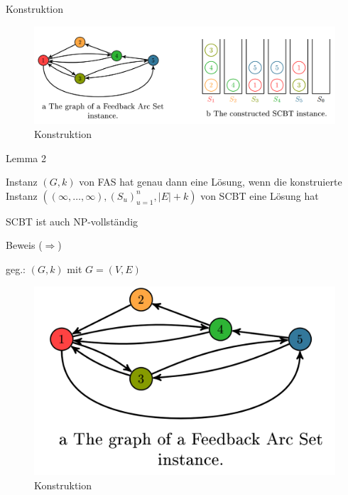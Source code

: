 \documentclass{beamer}
\begin{document}
\begin{frame}{Konstruktion}
\begin{figure}[ht]
		\includegraphics[width=\textwidth]{construct}
		\caption{Konstruktion}
    \end{figure}
\end{frame}

\begin{frame}{Lemma 2}
\begin{pointlist}
\item Instanz $(G,k)$ von FAS hat genau dann eine Lösung, wenn die konstruierte Instanz $((\infty, \dots, \infty), (S_u)_{u=1}^n, |E|+k)$ von SCBT eine Lösung hat
\begin{arrowlist}
\item SCBT ist auch NP-vollständig
\end{arrowlist}
\end{pointlist}
\end{frame}

\begin{frame}{Beweis (\glqq $\Rightarrow$\grqq)}
\begin{pointlist}
\item geg.: $(G,k)$ mit $G=(V,E)$
\end{pointlist}

	\begin{figure}[ht]
		\includegraphics[width=.75\textwidth]{graph}
		\caption{Konstruktion}
    \end{figure}
\end{frame}
\end{document}

